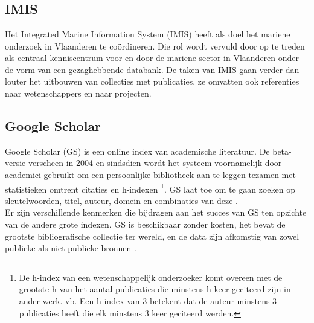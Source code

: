 \chapter{}%
\label{ch:stand-van-zaken}


\section{IMIS}
Het Integrated Marine Information System (IMIS) \autocite{Haspeslagh2024} heeft als doel het mariene onderzoek in Vlaanderen te coördineren. Die rol wordt vervuld door op te treden als centraal kenniscentrum voor en door de mariene sector in Vlaanderen onder de vorm van een gezaghebbende databank. De taken van IMIS gaan verder dan louter het uitbouwen van collecties met publicaties, ze omvatten ook referenties naar wetenschappers en naar projecten.
\section{Google Scholar}
Google Scholar (GS) is een online index van academische literatuur. De beta-versie verscheen in 2004 en sindsdien wordt het systeem voornamelijk door academici gebruikt om een persoonlijke bibliotheek aan te leggen tezamen met statistieken omtrent citaties en h-indexen \footnote{De h-index van een wetenschappelijk onderzoeker komt overeen met de grootste h van het aantal publicaties die minstens h keer geciteerd zijn in ander werk. vb. Een h-index van 3 betekent dat de auteur minstens 3 publicaties heeft die elk minstens 3 keer geciteerd werden.}. GS laat toe om te gaan zoeken op sleutelwoorden, titel, auteur, domein en combinaties van deze \autocite{Noruzi2005}.\\
Er zijn verschillende kenmerken die bijdragen aan het succes van GS ten opzichte van de andere grote indexen. GS is beschikbaar zonder kosten, het bevat de grootste bibliografische collectie ter wereld, en de data zijn afkomstig van zowel publieke als niet publieke bronnen \autocite{Aguillo2011}.
